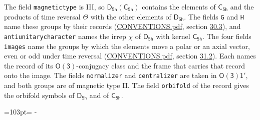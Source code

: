 \documentclass[10pt,a4paper]{article}
\newcommand{\needspace}[1]{\par\penalty-100\begingroup\dimen0=#1\relax\dimen2=\pagegoal
  \advance\dimen2-\pagetotal\ifdim\dimen0>\dimen2\relax\ifdim\dimen2>0pt\vfil\break\fi\fi
  \endgroup}
\numberwithin{equation}{section}
\newcommand{\grp}[1]{\mathsf{#1}}
\begin{document}
The field \texttt{magnetictype} is III, so $\grp{D_{5h}}(\grp{C_{5h}})$ contains the elements of $\grp{C_{5h}}$ and the products of time reversal $\varTheta$ with the other elements of $\grp{D_{5h}}$. The fields \texttt{G} and \texttt{H} name these groups by their records (\href{../../CONVENTIONS.pdf}{CONVENTIONS.pdf}, section \href{../../CONVENTIONS.pdf\#conv.30.3}{30.3}), and \texttt{antiunitarycharacter} names the irrep $\chi$ of $\grp{D_{5h}}$ with kernel $\grp{C_{5h}}$. The four fields \texttt{images} name the groups by which the elements move a polar or an axial vector, even or odd under time reversal (\href{../../CONVENTIONS.pdf}{CONVENTIONS.pdf}, section \href{../../CONVENTIONS.pdf\#conv.31.2}{31.2}). Each names the record of its $\grp{O(3)}$-conjugacy class and the frame that carries that record onto the image. The fields \texttt{normalizer} and \texttt{centralizer} are taken in $\grp{O(3)1'}$, and both groups are of magnetic type II. The field \texttt{orbifold} of the record gives the orbifold symbols of $\grp{D_{5h}}$ and of $\grp{C_{5h}}$.
\needspace{103pt}
\end{document}
